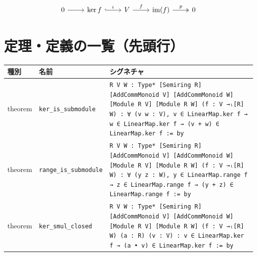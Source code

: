 \documentclass[12pt]{article}
\begin{document}
\[
\begin{tikzcd}
0 \arrow[r] & \ker f \arrow[r, hook, "i"] & V \arrow[r, "f"] & \mathrm{im}(f) \arrow[r, two heads, "p"] & 0
\end{tikzcd}
\]


\section*{定理・定義の一覧（先頭行）}
\begin{center}
\begin{tabular}{lll}
\textbf{種別} & \textbf{名前} & \textbf{シグネチャ} \\ \hline
theorem & \texttt{ker\_is\_submodule} & \texttt{{R V W : Type*} [Semiring R] [AddCommMonoid V] [AddCommMonoid W] [Module R V] [Module R W] (f : V →ₗ[R] W) : ∀ (v w : V), v ∈ LinearMap.ker f → w ∈ LinearMap.ker f → (v + w) ∈ LinearMap.ker f := by} \\
theorem & \texttt{range\_is\_submodule} & \texttt{{R V W : Type*} [Semiring R] [AddCommMonoid V] [AddCommMonoid W] [Module R V] [Module R W] (f : V →ₗ[R] W) : ∀ (y z : W), y ∈ LinearMap.range f → z ∈ LinearMap.range f → (y + z) ∈ LinearMap.range f := by} \\
theorem & \texttt{ker\_smul\_closed} & \texttt{{R V W : Type*} [Semiring R] [AddCommMonoid V] [AddCommMonoid W] [Module R V] [Module R W] (f : V →ₗ[R] W) (a : R) (v : V) : v ∈ LinearMap.ker f → (a • v) ∈ LinearMap.ker f := by} \\
\end{tabular}
\end{center}
\end{document}
